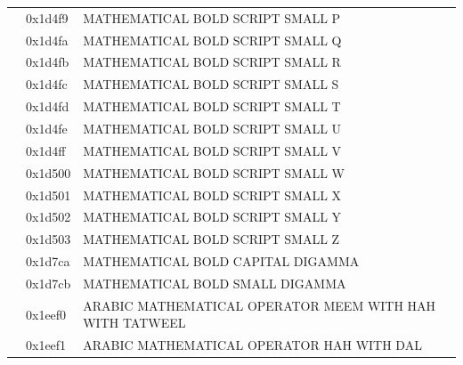 \documentclass[12pt, twoside]{article}
\begin{document}
\begin{longtable}{L{1.0cm} L{2.0cm} >{\footnotesize}L{10cm}}
&0x1d4f9&MATHEMATICAL BOLD SCRIPT SMALL P\\
&0x1d4fa&MATHEMATICAL BOLD SCRIPT SMALL Q\\
&0x1d4fb&MATHEMATICAL BOLD SCRIPT SMALL R\\
&0x1d4fc&MATHEMATICAL BOLD SCRIPT SMALL S\\
&0x1d4fd&MATHEMATICAL BOLD SCRIPT SMALL T\\
&0x1d4fe&MATHEMATICAL BOLD SCRIPT SMALL U\\
&0x1d4ff&MATHEMATICAL BOLD SCRIPT SMALL V\\
&0x1d500&MATHEMATICAL BOLD SCRIPT SMALL W\\
&0x1d501&MATHEMATICAL BOLD SCRIPT SMALL X\\
&0x1d502&MATHEMATICAL BOLD SCRIPT SMALL Y\\
&0x1d503&MATHEMATICAL BOLD SCRIPT SMALL Z\\
&0x1d7ca&MATHEMATICAL BOLD CAPITAL DIGAMMA\\
&0x1d7cb&MATHEMATICAL BOLD SMALL DIGAMMA\\
&0x1eef0&ARABIC MATHEMATICAL OPERATOR MEEM WITH HAH WITH TATWEEL\\
&0x1eef1&ARABIC MATHEMATICAL OPERATOR HAH WITH DAL\\
\end{longtable}
\end{document}
